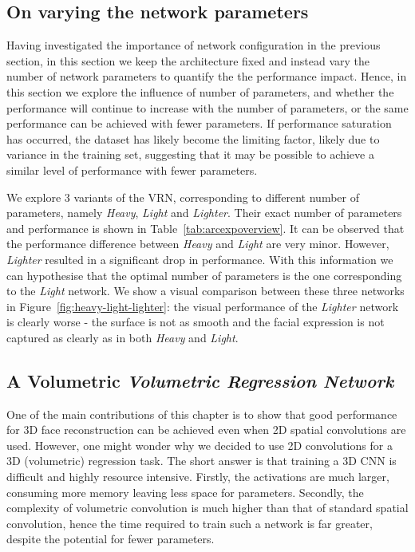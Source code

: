 \subsection{On varying the network parameters}
\label{sec:arc_params}

Having investigated the importance of network configuration in the
previous section, in this section we keep the architecture fixed and
instead vary the number of network parameters to quantify the the
performance impact. Hence, in this section we explore the influence of
number of parameters, and whether the performance will continue to
increase with the number of parameters, or the same performance can be
achieved with fewer parameters. If performance saturation has
occurred, the dataset has likely become the limiting factor, likely
due to variance in the training set, suggesting that it may be
possible to achieve a similar level of performance with fewer
parameters.

We explore 3 variants of the VRN, corresponding to different number of
parameters, namely \textit{Heavy}, \textit{Light} and
\textit{Lighter}. Their exact number of parameters and performance is
shown in Table~\ref{tab:arcexpoverview}. It can be observed that the
performance difference between \textit{Heavy} and \textit{Light} are
very minor. However, \textit{Lighter} resulted in a significant drop
in performance. With this information we can hypothesise that the
optimal number of parameters is the one corresponding to the
\textit{Light} network. We show a visual comparison between these
three networks in Figure~\ref{fig:heavy-light-lighter}: the visual
performance of the \textit{Lighter} network is clearly worse - the
surface is not as smooth and the facial expression is not captured as
clearly as in both \textit{Heavy} and \textit{Light}.

\subsection{A Volumetric \textit{Volumetric Regression Network}}
\label{sec:arc_volumetric}

One of the main contributions of this chapter is to show that good
performance for 3D face reconstruction can be achieved even when 2D
spatial convolutions are used.  However, one might wonder why we
decided to use 2D convolutions for a 3D (volumetric) regression
task. The short answer is that training a 3D CNN is difficult and
highly resource intensive. Firstly, the activations are much larger,
consuming more memory leaving less space for parameters. Secondly, the
complexity of volumetric convolution is much higher than that of
standard spatial convolution, hence the time required to train such a
network is far greater, despite the potential for fewer parameters.

